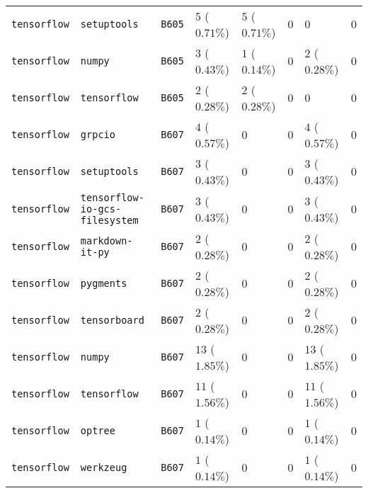 \begin{table}
\begin{tabular}{llllllll}
\texttt{tensorflow} & \texttt{setuptools} & \texttt{B605} & $5$ ($0.71\%$) & $5$ ($0.71\%$) & $0$ & $0$ & $0$ \\
\texttt{tensorflow} & \texttt{numpy} & \texttt{B605} & $3$ ($0.43\%$) & $1$ ($0.14\%$) & $0$ & $2$ ($0.28\%$) & $0$ \\
\texttt{tensorflow} & \texttt{tensorflow} & \texttt{B605} & $2$ ($0.28\%$) & $2$ ($0.28\%$) & $0$ & $0$ & $0$ \\
\texttt{tensorflow} & \texttt{grpcio} & \texttt{B607} & $4$ ($0.57\%$) & $0$ & $0$ & $4$ ($0.57\%$) & $0$ \\
\texttt{tensorflow} & \texttt{setuptools} & \texttt{B607} & $3$ ($0.43\%$) & $0$ & $0$ & $3$ ($0.43\%$) & $0$ \\
\texttt{tensorflow} & \texttt{tensorflow-io-gcs-filesystem} & \texttt{B607} & $3$ ($0.43\%$) & $0$ & $0$ & $3$ ($0.43\%$) & $0$ \\
\texttt{tensorflow} & \texttt{markdown-it-py} & \texttt{B607} & $2$ ($0.28\%$) & $0$ & $0$ & $2$ ($0.28\%$) & $0$ \\
\texttt{tensorflow} & \texttt{pygments} & \texttt{B607} & $2$ ($0.28\%$) & $0$ & $0$ & $2$ ($0.28\%$) & $0$ \\
\texttt{tensorflow} & \texttt{tensorboard} & \texttt{B607} & $2$ ($0.28\%$) & $0$ & $0$ & $2$ ($0.28\%$) & $0$ \\
\texttt{tensorflow} & \texttt{numpy} & \texttt{B607} & $13$ ($1.85\%$) & $0$ & $0$ & $13$ ($1.85\%$) & $0$ \\
\texttt{tensorflow} & \texttt{tensorflow} & \texttt{B607} & $11$ ($1.56\%$) & $0$ & $0$ & $11$ ($1.56\%$) & $0$ \\
\texttt{tensorflow} & \texttt{optree} & \texttt{B607} & $1$ ($0.14\%$) & $0$ & $0$ & $1$ ($0.14\%$) & $0$ \\
\texttt{tensorflow} & \texttt{werkzeug} & \texttt{B607} & $1$ ($0.14\%$) & $0$ & $0$ & $1$ ($0.14\%$) & $0$ \\
\bottomrule
\end{tabular}
\end{table}
